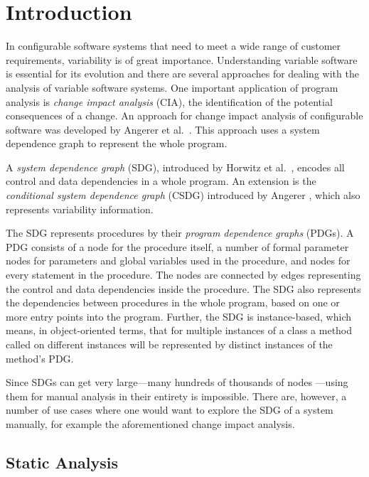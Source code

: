 \chapter{Introduction}

In configurable software systems that need to meet a wide range of customer requirements, variability is of great 
importance. Understanding variable software is essential for its evolution and there are several approaches for dealing 
with the analysis of variable software systems. One important application of program analysis is \emph{change impact 
analysis} (CIA), the identification of the potential consequences of a change. An approach for change impact analysis 
of configurable software was developed by Angerer et al.\ \cite{DBLP:conf/kbse/AngererGPG15}. This approach uses a 
system dependence graph to represent the whole program.

A \emph{system dependence graph} (SDG), introduced by Horwitz et al.\ \cite{DBLP:journals/toplas/HorwitzRB90}, encodes 
all control and data dependencies in a whole program. An extension is the \emph{conditional system dependence graph} 
(CSDG) introduced by Angerer \cite{DBLP:conf/splc/AngererPLGG14}, which also represents variability information.

The SDG represents procedures by their \emph{program dependence graphs} (PDGs). A PDG consists of a node for the 
procedure itself, a number of formal parameter nodes for parameters and global variables used in the procedure, and 
nodes for every statement in the procedure. The nodes are connected by edges representing the control and data 
dependencies inside the procedure. The SDG also represents the dependencies between procedures in the whole program, 
based on one or more entry points into the program. Further, the SDG is instance-based, which means, in object-oriented 
terms, that for multiple instances of a class a method called on different instances will be represented by 
distinct instances of the method's PDG.

Since SDGs can get very large---many hundreds of thousands of nodes 
\cite[sec.~4.3]{DBLP:conf/splc/AngererPLGG14}---using them for manual analysis in their entirety is impossible. There 
are, however, a number of use cases where one would want to explore the SDG of a system manually, for example the 
aforementioned change impact analysis.


\section{Static Analysis}


